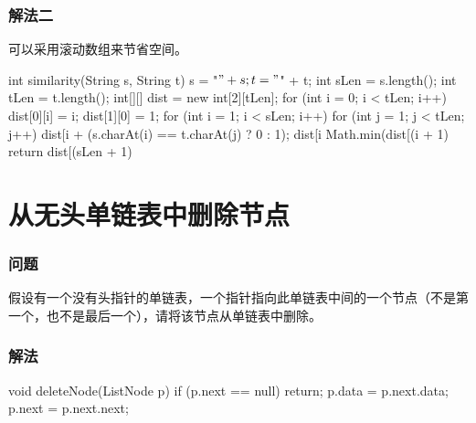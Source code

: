 \subsubsection{解法二}
可以采用滚动数组来节省空间。

\begin{Codex}[label={[$O(N*M)+O(M)$]Chap03_03_StringSimilarity.java}]
int similarity(String s, String t) {
	s = "$" + s;
	t = "$" + t;
	int sLen = s.length();
	int tLen = t.length();
	int[][] dist = new int[2][tLen];
	for (int i = 0; i < tLen; i++) {
		dist[0][i] = i;
	}
	dist[1][0] = 1;
	for (int i = 1; i < sLen; i++) {
		for (int j = 1; j < tLen; j++) {
			dist[i %
					+ (s.charAt(i) == t.charAt(j) ? 0 : 1);
			dist[i %
					Math.min(dist[(i + 1) %
		}
	}
	return dist[(sLen + 1) %
}
\end{Codex}

\section{从无头单链表中删除节点} %
\label{sec:delete-linked-list-node}


\subsubsection{问题}
假设有一个没有头指针的单链表，一个指针指向此单链表中间的一个节点（不是第一个，也不是最后一个），请将该节点从单链表中删除。

\subsubsection{解法}

\begin{Codex}[label={[$O(1)+O(1)$]Chap03_04_DeleteLinkedListNode.java}]
void deleteNode(ListNode p) {
	if (p.next == null) {
		return;
	}
	p.data = p.next.data;
	p.next = p.next.next;
}
\end{Codex}

